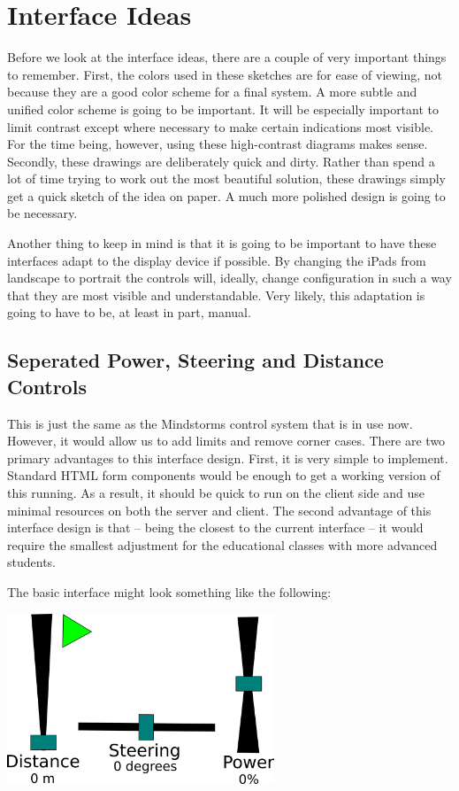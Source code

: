 \documentclass[letterpaper,10pt]{article}
\begin{document}
\section{Interface Ideas}
  Before we look at the interface ideas, there are a couple of very important things to remember.  First, the colors used in these sketches are for ease of viewing, not because they are a good color scheme for a final system.  A more subtle and unified color scheme is going to be important.  It will be especially important to limit contrast except where necessary to make certain indications most visible.  For the time being, however, using these high-contrast diagrams makes sense.  Secondly, these drawings are deliberately quick and dirty.  Rather than spend a lot of time trying to work out the most beautiful solution, these drawings simply get a quick sketch of the idea on paper.  A much more polished design is going to be necessary.
  
  Another thing to keep in mind is that it is going to be important to have these interfaces adapt to the display device if possible.  By changing the iPads from landscape to portrait the controls will, ideally, change configuration in such a way that they are most visible and understandable.  Very likely, this adaptation is going to have to be, at least in part, manual.
  
  \subsection{Seperated Power, Steering and Distance Controls}
    This is just the same as the Mindstorms control system that is in use now.  However, it would allow us to add limits and remove corner cases.  There are two primary advantages to this interface design.  First, it is very simple to implement.  Standard HTML form components would be enough to get a working version of this running.  As a result, it should be quick to run on the client side and use minimal resources on both the server and client.  The second advantage of this interface design is that -- being the closest to the current interface -- it would require the smallest adjustment for the educational classes with more advanced students.
  
    The basic interface might look something like the following:
    
    \includegraphics[width=8cm]{seperated_neutral}
\end{document}
